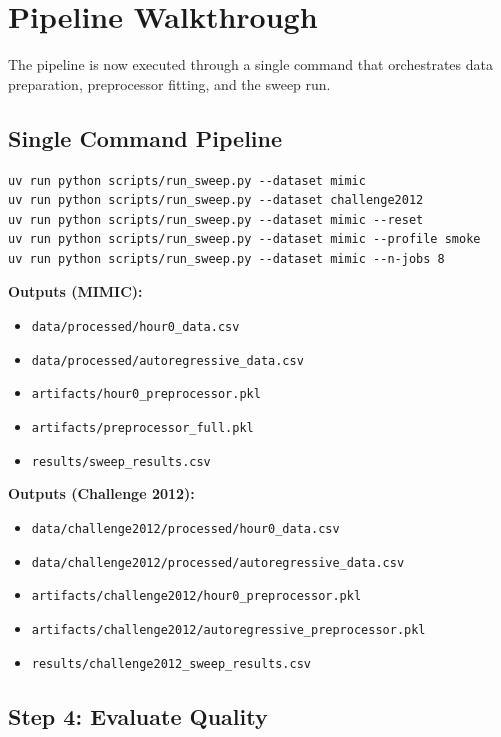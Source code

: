 \section{Pipeline Walkthrough}

The pipeline is now executed through a single command that orchestrates data
preparation, preprocessor fitting, and the sweep run.

\subsection{Single Command Pipeline}

\begin{verbatim}
uv run python scripts/run_sweep.py --dataset mimic
uv run python scripts/run_sweep.py --dataset challenge2012
uv run python scripts/run_sweep.py --dataset mimic --reset
uv run python scripts/run_sweep.py --dataset mimic --profile smoke
uv run python scripts/run_sweep.py --dataset mimic --n-jobs 8
\end{verbatim}

\textbf{Outputs (MIMIC):}
\begin{itemize}\tightlist
    \item \texttt{data/processed/hour0\_data.csv}
    \item \texttt{data/processed/autoregressive\_data.csv}
    \item \texttt{artifacts/hour0\_preprocessor.pkl}
    \item \texttt{artifacts/preprocessor\_full.pkl}
    \item \texttt{results/sweep\_results.csv}
\end{itemize}

\textbf{Outputs (Challenge 2012):}
\begin{itemize}\tightlist
    \item \texttt{data/challenge2012/processed/hour0\_data.csv}
    \item \texttt{data/challenge2012/processed/autoregressive\_data.csv}
    \item \texttt{artifacts/challenge2012/hour0\_preprocessor.pkl}
    \item \texttt{artifacts/challenge2012/autoregressive\_preprocessor.pkl}
    \item \texttt{results/challenge2012\_sweep\_results.csv}
\end{itemize}

\subsection{Step 4: Evaluate Quality}


